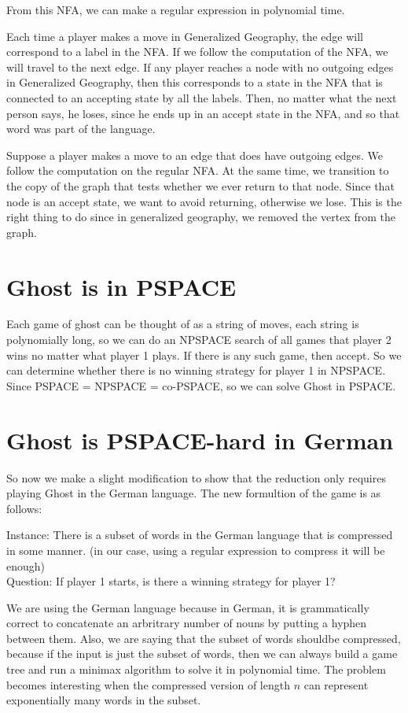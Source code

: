 \documentclass[11pt]{article}
\begin{document}
From this NFA, we can make a regular expression in polynomial time.

Each time a player makes a move in Generalized Geography, the edge will correspond to a label in the NFA. If we follow the computation of the NFA, we will travel to the next edge. If any player reaches a node with no outgoing edges in Generalized Geography, then this corresponds to a state in the NFA that is connected to an accepting state by all the labels. Then, no matter what the next person says, he loses, since he ends up in an accept state in the NFA, and so that word was part of the language.

Suppose a player makes a move to an edge that does have outgoing edges. We follow the computation on the regular NFA. At the same time, we transition to the copy of the graph that tests whether we ever return to that node. Since that node is an accept state, we want to avoid returning, otherwise we lose. This is the right thing to do since in generalized geography, we removed the vertex from the graph. 

\section{Ghost is in PSPACE}

Each game of ghost can be thought of as a string of moves, each string is polynomially long, so we can do an NPSPACE search of all games that player 2 wins no matter what player 1 plays. If there is any such game, then accept. So we can determine whether there is no winning strategy for player 1 in NPSPACE. Since PSPACE = NPSPACE = co-PSPACE, so we can solve Ghost in PSPACE. 

\section{Ghost is PSPACE-hard in German}

So now we make a slight modification to show that the reduction only requires playing Ghost in the German language. The new formultion of the game is as follows:

Instance: There is a subset of words in the German language that is compressed in some manner. (in our case, using a regular expression to compress it will be enough)\\
Question: If player 1 starts, is there a winning strategy for player 1? 

We are using the German language because in German, it is grammatically correct to concatenate an arbritrary number of nouns by putting a hyphen between them. Also, we are saying that the subset of words shouldbe compressed, because if the input is just the subset of words, then we can always build a game tree and run a minimax algorithm to solve it in polynomial time. The problem becomes interesting when the compressed version of length $n$ can represent exponentially many words in the subset. 
\end{document}
